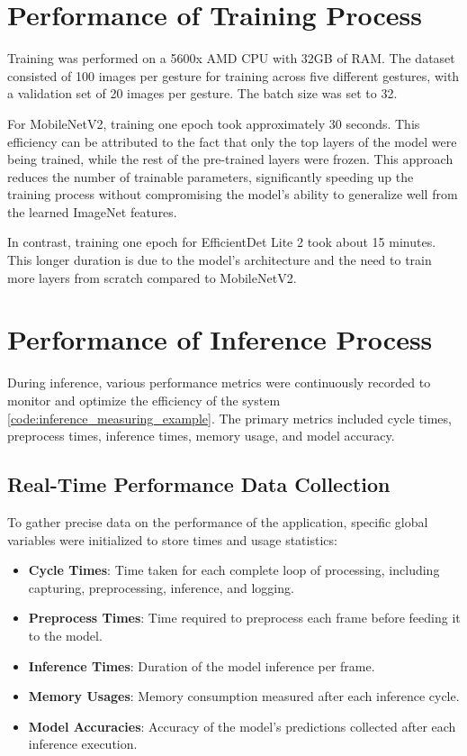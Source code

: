 \section{Performance of Training Process}
Training was performed on a 5600x AMD CPU with 32GB of RAM. The dataset consisted of 100 images per gesture for training across five different gestures, with a validation set of 20 images per gesture. The batch size was set to 32.

For MobileNetV2, training one epoch took approximately 30 seconds. This efficiency can be attributed to the fact that only the top layers of the model were being trained, while the rest of the pre-trained layers were frozen. This approach reduces the number of trainable parameters, significantly speeding up the training process without compromising the model’s ability to generalize well from the learned ImageNet features.

In contrast, training one epoch for EfficientDet Lite 2 took about 15 minutes. This longer duration is due to the model's architecture and the need to train more layers from scratch compared to MobileNetV2.

\section{Performance of Inference Process}
During inference, various performance metrics were continuously recorded to monitor and optimize the efficiency of the system \ref{code:inference_measuring_example}. The primary metrics included cycle times, preprocess times, inference times, memory usage, and model accuracy.

\subsection{Real-Time Performance Data Collection}
To gather precise data on the performance of the application, specific global variables were initialized to store times and usage statistics:

\begin{itemize}
    \item \textbf{Cycle Times}: Time taken for each complete loop of processing, including capturing, preprocessing, inference, and logging.
    \item \textbf{Preprocess Times}: Time required to preprocess each frame before feeding it to the model.
    \item \textbf{Inference Times}: Duration of the model inference per frame.
    \item \textbf{Memory Usages}: Memory consumption measured after each inference cycle.
    \item \textbf{Model Accuracies}: Accuracy of the model's predictions collected after each inference execution.
\end{itemize}

